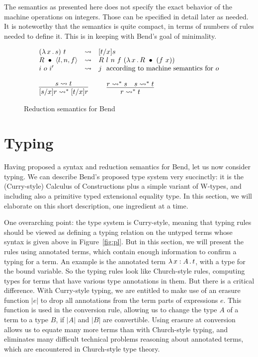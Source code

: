 \documentclass{article}
\begin{document}
The semantics as presented here does not specify the exact behavior of the machine operations
on integers.  Those can be specified in detail later as needed.  It is noteworthy that the
semantics is quite compact, in terms of numbers of rules needed to define it.  This is
in keeping with Bend's goal of minimality.

\begin{figure}
  \[
\begin{array}{l}
  \begin{array}{lll}
    (\lam{x}{s})\ t & \leadsto & [t/x]s \\
    \wrec{R}{\ctor{l}{n}{f}} & \leadsto & R\ l\ n\ f\ (\lam{x}{\wrec{R}{(f\ x)}}) \\
    i\ o\ i' & \leadsto & j\ \ \textnormal{according to machine semantics for }o
  \end{array}
  \\ \\
  \begin{array}{lll}
  \infer{[s/x]r \leadsto^* [t/x]r}{s \leadsto t} &\ \ &
  \infer{r \leadsto^* t}{r \leadsto^* s & s \leadsto^* t}
  \end{array}
\end{array}  
\]
  \caption{Reduction semantics for Bend}
  \label{fig:opsem}
  \end{figure}

\section{Typing}

Having proposed a syntax and reduction semantics for Bend, let us now
consider typing.  We can describe Bend's proposed type system very
succinctly: it is the (Curry-style) Calculus of Constructions plus a
simple variant of W-types, and including also a primitive typed
extensional equality type.  In this section, we will elaborate on
this short description, one ingredient at a time.

One overarching point: the type system is Curry-style, meaning that
typing rules should be viewed as defining a typing relation on the
untyped terms whose syntax is given above in Figure~\ref{fig:pl}.  But
in this section, we will present the rules using annotated terms,
which contain enough information to confirm a typing for a term.  An
example is the annotated term $\lambda\, x : A\, .\, t$, with a type for the
bound variable.  So the typing rules look like Church-style rules,
computing types for terms that have various type annotations in them.
But there is a critical difference.  With Curry-style typing, we are
entitled to make use of an erasure function $|e|$ to drop all
annotations from the term parts of expressions $e$.  This function is
used in the conversion rule, allowing us to change the type $A$ of a
term to a type $B$, if $|A|$ and $|B|$ are convertible.  Using erasure
at conversion allows us to equate many more terms than with
Church-style typing, and eliminates many difficult technical problems
reasoning about annotated terms, which are encountered in Church-style
type theory.
\end{document}
